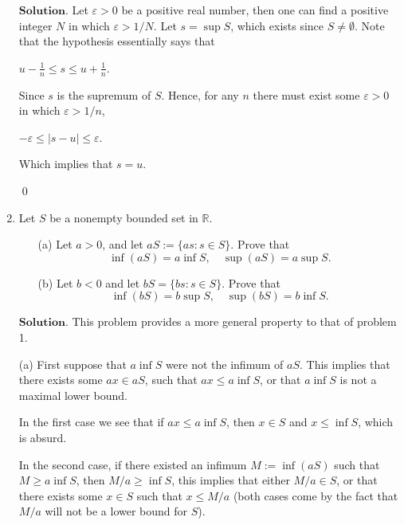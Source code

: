 \documentclass{article}
\theoremstyle{remark}
\begin{document}
\begin{enumerate}
            $\textbf{Solution.}$ Let $\varepsilon > 0$ be a positive real number, then one can find a positive integer $N$ in which 
            $\varepsilon > 1/N$. Let $s = \sup S$, which exists since $S \neq \emptyset$. 
            Note that the hypothesis essentially says that 
            \begin{center}
                $\displaystyle u - \frac{1}{n} \leq s \leq u + \frac{1}{n}$.
            \end{center}
            Since $s$ is the supremum of $S$.
            Hence, for any $n$ there must exist some $\varepsilon > 0$ in which $\varepsilon > 1/n$, 
            \begin{center}
                $-\varepsilon \leq \vert s-u \vert \leq \varepsilon$.
            \end{center}
            Which implies that $s = u$.
            \begin{flushright}
                \qed
            \end{flushright}

            \item Let \( S \) be a nonempty bounded set in \( \mathbb{R} \).

            \begin{enumerate}
                \item[(a)] Let \( a > 0 \), and let \( aS := \{as : s \in S\} \). Prove that
                \[
                \inf(aS) = a \inf S, \quad \sup(aS) = a \sup S.
                \]
            
                \item[(b)] Let \( b < 0 \) and let \( bS = \{bs : s \in S\} \). Prove that
                \[
                \inf(bS) = b \sup S, \quad \sup(bS) = b \inf S.
                \]
            \end{enumerate}
            $\textbf{Solution.}$
            This problem provides a more general property to that of problem 1.

            (a) First suppose that $a \inf S$ were not the infimum of $aS$. This implies that 
            there exists some $ax \in aS$, such that $ax \leq a\inf S$, or that $a \inf S$ is not a maximal lower bound.
            
            In the first case we see that if $ax \leq a\inf S$, then $x \in S$ and $x \leq \inf S$, which is absurd.

            In the second case, if there existed an infimum $M := \inf (aS)$ such that $M \geq a \inf S$, then $M/a \geq \inf S$, this implies that
            either $M/a \in S$, or that there exists some $x \in S$ such that $x \leq M/a$ (both cases come by the fact that $M/a$ will not be a lower bound for $S$). 
            

\end{enumerate}
\end{document}
